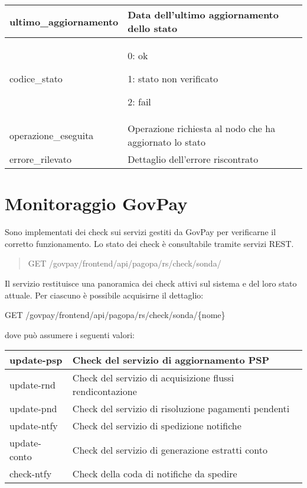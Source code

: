 \documentclass[letterpaper,10pt,italian]{sphinxmanual}
\begin{document}
\begin{savenotes}\sphinxattablestart
\centering
\begin{tabulary}{\linewidth}[t]{|T|T|}
\hline

ultimo\_aggiornamento
&
Data dell’ultimo aggiornamento
dello stato
\\
\hline
codice\_stato
&
0: ok

1: stato non verificato

2: fail
\\
\hline
operazione\_eseguita
&
Operazione richiesta al nodo che
ha aggiornato lo stato
\\
\hline
errore\_rilevato
&
Dettaglio dell’errore riscontrato
\\
\hline
\end{tabulary}
\par
\sphinxattableend\end{savenotes}


\section{Monitoraggio GovPay}
\label{\detokenize{monitoraggio/index:monitoraggio-govpay}}
Sono implementati dei check sui servizi gestiti da GovPay per
verificarne il corretto funzionamento. Lo stato dei check è consultabile
tramite servizi REST.
\begin{quote}

GET /govpay/frontend/api/pagopa/rs/check/sonda/
\end{quote}

Il servizio restituisce una panoramica dei check attivi sul sistema e
del loro stato attuale. Per ciascuno è possibile acquisirne il
dettaglio:

GET /govpay/frontend/api/pagopa/rs/check/sonda/\{nome\}

dove  può assumere i seguenti valori:


\begin{savenotes}\sphinxattablestart
\centering
\begin{tabulary}{\linewidth}[t]{|T|T|}
\hline

update-psp
&
Check del servizio di aggiornamento PSP
\\
\hline
update-rnd
&
Check del servizio di acquisizione flussi rendicontazione
\\
\hline
update-pnd
&
Check del servizio di risoluzione pagamenti pendenti
\\
\hline
update-ntfy
&
Check del servizio di spedizione notifiche
\\
\hline
update-conto
&
Check del servizio di generazione estratti conto
\\
\hline
check-ntfy
&
Check della coda di notifiche da spedire
\\
\hline
\end{tabulary}
\par
\sphinxattableend\end{savenotes}
\end{document}
